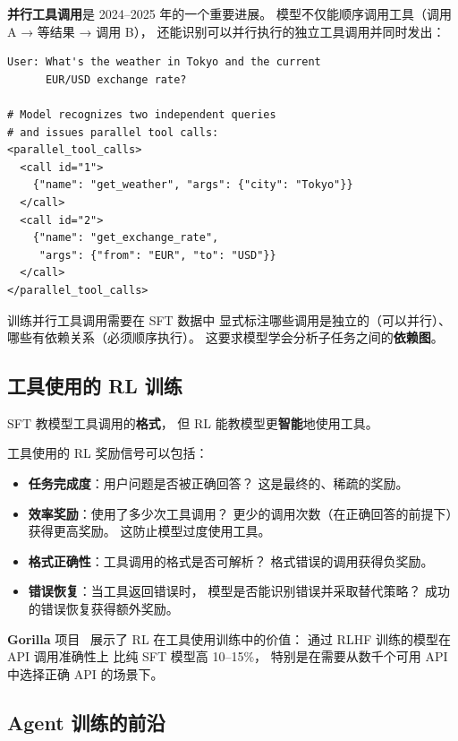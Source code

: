 \textbf{并行工具调用}是 2024--2025 年的一个重要进展。
模型不仅能顺序调用工具（调用 A → 等结果 → 调用 B），
还能识别可以并行执行的独立工具调用并同时发出：

\begin{lstlisting}[caption={Parallel tool calling}]
User: What's the weather in Tokyo and the current
      EUR/USD exchange rate?

# Model recognizes two independent queries
# and issues parallel tool calls:
<parallel_tool_calls>
  <call id="1">
    {"name": "get_weather", "args": {"city": "Tokyo"}}
  </call>
  <call id="2">
    {"name": "get_exchange_rate",
     "args": {"from": "EUR", "to": "USD"}}
  </call>
</parallel_tool_calls>
\end{lstlisting}

训练并行工具调用需要在 SFT 数据中
显式标注哪些调用是独立的（可以并行）、
哪些有依赖关系（必须顺序执行）。
这要求模型学会分析子任务之间的\textbf{依赖图}。

\subsection{工具使用的 RL 训练}

SFT 教模型工具调用的\textbf{格式}，
但 RL 能教模型更\textbf{智能}地使用工具。

工具使用的 RL 奖励信号可以包括：
\begin{itemize}[noitemsep]
  \item \textbf{任务完成度}：用户问题是否被正确回答？
        这是最终的、稀疏的奖励。
  \item \textbf{效率奖励}：使用了多少次工具调用？
        更少的调用次数（在正确回答的前提下）获得更高奖励。
        这防止模型过度使用工具。
  \item \textbf{格式正确性}：工具调用的格式是否可解析？
        格式错误的调用获得负奖励。
  \item \textbf{错误恢复}：当工具返回错误时，
        模型是否能识别错误并采取替代策略？
        成功的错误恢复获得额外奖励。
\end{itemize}

\textbf{Gorilla} 项目~\cite{patil2023gorilla}
展示了 RL 在工具使用训练中的价值：
通过 RLHF 训练的模型在 API 调用准确性上
比纯 SFT 模型高 10--15\%，
特别是在需要从数千个可用 API 中选择正确 API 的场景下。

\subsection{Agent 训练的前沿}

